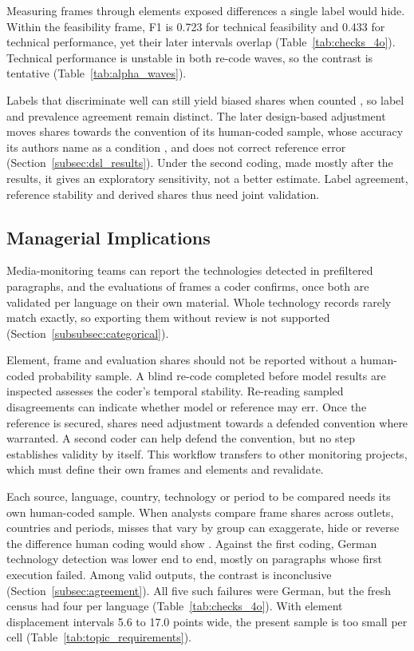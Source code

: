 Measuring frames through elements \parencite{ali2025hydrogenframing,liu2023strategyframing} exposed differences a single label would hide. Within the feasibility frame, F1 is 0.723 for technical feasibility and 0.433 for technical performance, yet their later intervals overlap (Table~\ref{tab:checks_4o}). Technical performance is unstable in both re-code waves, so the contrast is tentative (Table~\ref{tab:alpha_waves}).

Labels that discriminate well can still yield biased shares when counted \parencite[pp.~7--8]{linder2026multicalibrated}, so label and prevalence agreement remain distinct. The later design-based adjustment moves shares towards the convention of its human-coded sample, whose accuracy its authors name as a condition \parencite[Sec.~6]{egami2023dsl}, and does not correct reference error (Section~\ref{subsec:dsl_results}). Under the second coding, made mostly after the results, it gives an exploratory sensitivity, not a better estimate. Label agreement, reference stability and derived shares thus need joint validation.

\subsection{Managerial Implications}\label{subsec:managerial_implications}

Media-monitoring teams can report the technologies detected in prefiltered paragraphs, and the evaluations of frames a coder confirms, once both are validated per language on their own material. Whole technology records rarely match exactly, so exporting them without review is not supported (Section~\ref{subsubsec:categorical}).

Element, frame and evaluation shares should not be reported without a human-coded probability sample. A blind re-code completed before model results are inspected assesses the coder's temporal stability. Re-reading sampled disagreements can indicate whether model or reference may err. Once the reference is secured, shares need adjustment towards a defended convention where warranted. A second coder can help defend the convention, but no step establishes validity by itself. This workflow transfers to other monitoring projects, which must define their own frames and elements and revalidate.

Each source, language, country, technology or period to be compared needs its own human-coded sample. When analysts compare frame shares across outlets, countries and periods, misses that vary by group can exaggerate, hide or reverse the difference human coding would show \parencite[p.~2092]{edwards2026rogangladen}. Against the first coding, German technology detection was lower end to end, mostly on paragraphs whose first execution failed. Among valid outputs, the contrast is inconclusive (Section~\ref{subsec:agreement}). All five such failures were German, but the fresh census had four per language (Table~\ref{tab:checks_4o}). With element displacement intervals 5.6 to 17.0 points wide, the present sample is too small per cell (Table~\ref{tab:topic_requirements}).

